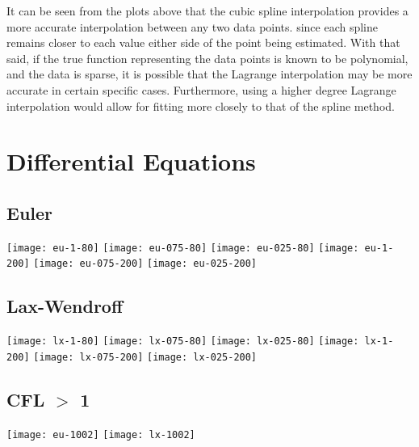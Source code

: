 \documentclass[10pt, twocolumn]{article}
\begin{document}
	It can be seen from the plots above that the cubic spline interpolation provides a more accurate interpolation between any two data points. since each spline remains closer to each value either side of the point being estimated. With that said, if the true function representing the data points is known to be polynomial, and the data is sparse, it is possible that the Lagrange interpolation may be more accurate in certain specific cases. Furthermore, using a higher degree Lagrange interpolation would allow for fitting more closely to that of the spline method.
	
\section{Differential Equations}
\subsection*{Euler}
	\texttt{[image: eu-1-80]}
	\texttt{[image: eu-075-80]}
	\texttt{[image: eu-025-80]}
	\texttt{[image: eu-1-200]}
	\texttt{[image: eu-075-200]}
	\texttt{[image: eu-025-200]}
	
\subsection*{Lax-Wendroff}
	\texttt{[image: lx-1-80]}
	\texttt{[image: lx-075-80]}
	\texttt{[image: lx-025-80]}
	\texttt{[image: lx-1-200]}
	\texttt{[image: lx-075-200]}
	\texttt{[image: lx-025-200]}

\subsection*{CFL $>$ 1}
\texttt{[image: eu-1002]}
\texttt{[image: lx-1002]}
\end{document}
